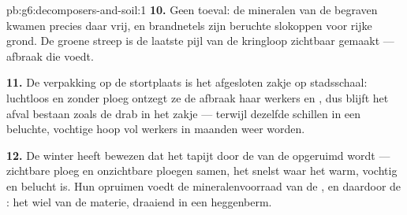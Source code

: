 \begin{solution}{pb:g6:decomposers-and-soil:1}
\textbf{10.} Geen toeval: de mineralen van de begraven  kwamen
precies daar vrij, en brandnetels zijn beruchte slokoppen voor rijke
grond. De groene streep is de laatste pijl van de kringloop zichtbaar
gemaakt --- afbraak die  voedt.

\textbf{11.} De verpakking op de stortplaats is het afgesloten zakje op
stadsschaal: luchtloos en zonder ploeg ontzegt ze de afbraak haar werkers
en , dus blijft het afval bestaan zoals de drab in het
zakje --- terwijl dezelfde schillen in een beluchte, vochtige hoop vol
werkers in maanden weer  worden.

\textbf{12.} De winter heeft bewezen dat het tapijt door de  van
de  opgeruimd wordt --- zichtbare ploeg en onzichtbare ploegen
samen, het snelst waar het warm, vochtig en belucht is. Hun opruimen
voedt de mineralenvoorraad van de , en daardoor de : het
wiel van de materie, draaiend in een heggenberm.
\end{solution}
